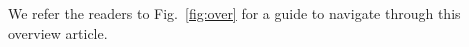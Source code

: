 \documentclass[10pt,twocolumn,twoside]{IEEEtran}
\begin{document}
We refer the readers to Fig.~\ref{fig:over} for a guide to navigate through this overview article.









\end{document}

